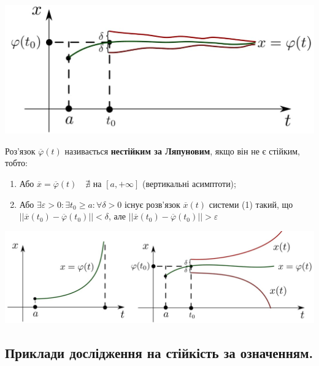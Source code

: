 \documentclass[14pt,a4paper]{scrartcl}
\theoremstyle{definition}
\theoremstyle{definition}
\theoremstyle{definition}
\begin{document}
\begin{center} \includegraphics[scale=0.35]{assets/lect2.jpg} \end{center}

Роз'язок $\overline{\varphi}(t)$ називається \textbf{нестійким за Ляпуновим}, якщо він не є стійким, тобто:
\ed

\begin{enumerate}
  \item Або $\overline{x} = \overline{\varphi}(t) \quad \nexists$ на  $[a, +\infty]$ (вертикальні асимптоти);
  \item Або $\exists \varepsilon > 0 : \exists t_0 \geq a :  \forall \delta > 0$ існує розв'язок $\overline{x}(t)$ системи (1) такий, що $||\overline{x}(t_0) - \overline{\varphi}(t_0)|| < \delta$, але $||\overline{x}(t_0) - \overline{\varphi}(t_0)|| > \varepsilon$
\end{enumerate}

\vfill
\begin{center} \includegraphics[scale=1.15]{assets/lect3+4.jpg} \end{center}
\vfill
\subsection{Приклади дослідження на стійкість за означенням.}
\end{document}
